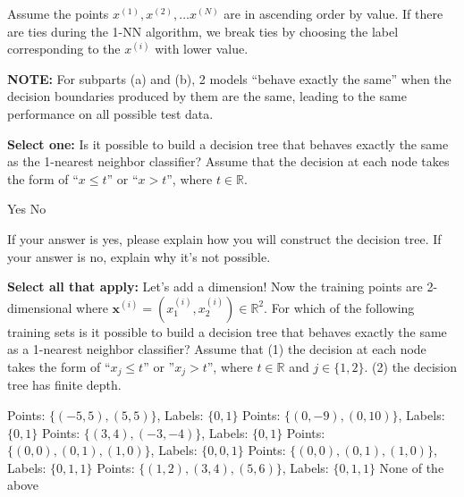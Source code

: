 \documentclass[11pt,addpoints,answers]{exam}
\newcommand{\xv}{\mathbf{x}}
\newcommand{\sall}{\textbf{Select all that apply: }}
\newcommand{\sone}{\textbf{Select one: }}
\begin{document}
\begin{questions}
\begin{parts}
    Assume the points $x^{(1)}, x^{(2)}, \ldots x^{(N)}$ are in ascending order by value. If there are ties during the 1-NN algorithm, we break ties by choosing the label corresponding to the $x^{(i)}$ with lower value. 

    \textbf{NOTE:} For subparts (a) and (b), 2 models ``behave exactly the same'' when the decision boundaries produced by them are the same, leading to the same performance on all possible test data.
    
    
    \begin{subparts} 
    \subpart[2] \sone Is it possible to build a decision tree that behaves exactly the same as the 1-nearest neighbor classifier? Assume that the decision at each node takes the form of ``$x \leq t$'' or ``$x > t$'', where $t \in \mathbb{R}$.
    
    \begin{checkboxes}
        \choice Yes
        \choice No
    \end{checkboxes}
     If your answer is yes, please explain how you will construct the decision tree. If your answer is no, explain why it’s not possible. 
   
    \begin{your_solution}[title=Your answer:,height=6cm,width=15cm]
        
    \end{your_solution}
    
    \clearpage

    \subpart[3] \sall Let's add a dimension! Now the training points are 2-dimensional where $\xv^{(i)} = \left(x_1^{(i)}, x_2^{(i)}\right) \in \mathbb{R}^2$. For which of the following training sets is it possible to build a decision tree that behaves exactly the same as a 1-nearest neighbor classifier? Assume that (1) the decision at each node takes the form of ``$x_j \leq t$'' or ''$x_j > t$'', where $t \in \mathbb{R}$ and $j \in \{1,2\}$. (2) the decision tree has finite depth.
    {
    \checkboxchar{$\Box$} \checkedchar{$\blacksquare$}
    \begin{checkboxes}
        \choice Points: $\{(-5,5), (5,5)\}$, Labels: $\{0,1\}$
        \choice Points: $\{(0,-9), (0,10)\}$, Labels: $\{0,1\}$
        \choice Points: $\{(3,4), (-3,-4)\}$, Labels: $\{0,1\}$
        \choice Points: $\{(0,0), (0,1), (1,0)\}$, Labels: $\{0,0,1\}$
        \choice Points: $\{(0,0), (0,1), (1,0)\}$, Labels: $\{0,1,1\}$
        \choice Points: $\{(1,2), (3,4), (5,6)\}$, Labels: $\{0,1,1\}$
        \choice None of the above
    \end{checkboxes}
    }
    \end{subparts}
    

\end{parts}
\end{questions}
\end{document}
